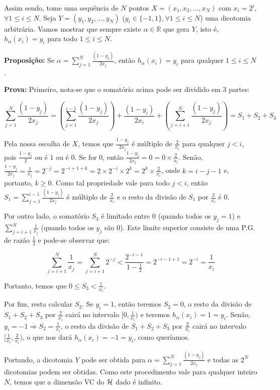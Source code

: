     Assim sendo, tome uma sequência de $N$ pontos $X = (x_1, x_2, \ldots, x_N)$ com $x_i = 2^i$, $\forall 1 \leq i \leq N$. Seja
    $Y = (y_1, y_2, \ldots, y_N)$ ($y_i \in \{-1, 1\}, \forall 1 \leq i \leq N$) uma dicotomia arbitrária. Vamos mostrar que sempre existe $\alpha \in \mathbb{R}$
    que gera $Y$, isto é, $h_{\alpha}(x_i) = y_i$ para todo $1 \leq i \leq N$.
    
    \textbf{Proposição: } Se $\alpha = \sum\limits_{j = 1}^N \frac{(1-y_j)}{2x_j}$, então $h_{\alpha}(x_i) = y_i$ para qualquer $1 \leq i \leq N$.
    
    \textbf{Prova: } Primeiro, nota-se que o somatório acima pode ser dividido em 3 partes: 
    
    \[
     \sum\limits_{j = 1}^N \frac{(1-y_j)}{2x_j}  = (\sum\limits_{j = 1}^{i - 1} \frac{(1-y_j)}{2x_j}) + \frac{(1-y_i)}{2x_i} + (\sum\limits_{j = i + 1}^{N} \frac{(1-y_j)}{2x_j}) = S_1 + S_2 + S_3
    \]

    Pela nossa escolha de $X$, temos que $\frac{1-y_j}{2x_j}$ é múltiplo de $\frac{2}{x_i}$ para qualquer $j < i$, pois $\frac{1-y_j}{2}$ ou é $1$ ou é $0$. Se for 0,
    então $\frac{1-y_j}{2x_j} = 0 = 0 \times \frac{2}{x_i}$. Senão,
    $\frac{1-y_j}{2x_j} = \frac{1}{x_j} = 2^{-j} = 2^{-i + 1 + k} = 2 \times 2^{-i} \times 2^k = 2^k \times \frac{2}{x_i}$, onde $k = i - j - 1$ e, portanto, $k \geq 0$.
    Como tal propriedade vale para todo $j < i$, então $S_1 = \sum\limits_{j = 1}^{i - 1} \frac{(1-y_j)}{2x_j}$ é múltiplo de $\frac{2}{x_i}$ e o resto da divisão de $S_1$
    por $\frac{2}{x_i}$ é 0.
    
    Por outro lado, o somatório $S_3$ é limitado entre $0$ (quando todos os $y_j  = 1$) e $\sum\limits_{j = i + 1}^{N} \frac{1}{x_j}$ (quando todos os $y_j$ são 0). Este limite
    superior consiste de uma P.G. de razão $\frac{1}{2}$ e pode-se observar que:
    
    \[
      \sum\limits_{j = i + 1}^{N} \frac{1}{x_j} = \sum\limits_{j = i + 1}^{N} 2^{-j} < \frac{2^{-i-1}}{1 - \frac{1}{2}} = 2^{-i-1+1} = 2^{-i} = \frac{1}{x_i}
    \]

    Portanto, temos que $0 \leq S_3 < \frac{1}{x_i}$.
    
    Por fim, resta calcular $S_2$. Se $y_i = 1$, então teremos $S_2 = 0$, o resto da divisão de $S_1 + S_2 + S_3$ por $\frac{2}{x_i}$ cairá no intervalo $[0, \frac{1}{x_i})$ e
    teremos $h_\alpha(x_i) = 1 = y_i$. Senão, $y_i = -1 \Rightarrow S_2 = \frac{1}{x_i}$, o resto da divisão de
    $S_1 + S_2 + S_3$ por $\frac{2}{x_i}$ cairá no intervalo $[\frac{1}{x_i}, \frac{2}{x_i})$, o que nos dará $h_\alpha(x_i) = -1 = y_i$, como queríamos.
    
    Portando, a dicotomia $Y$ pode ser obtida para $\alpha = \sum\limits_{j = 1}^N \frac{(1-y_j)}{2x_j}$ e todas as $2^N$ dicotomias podem ser obtidas. Como este procedimento
    vale para qualquer inteiro $N$, temos que a dimensão VC do $\mathcal{H}$ dado é infinito.
